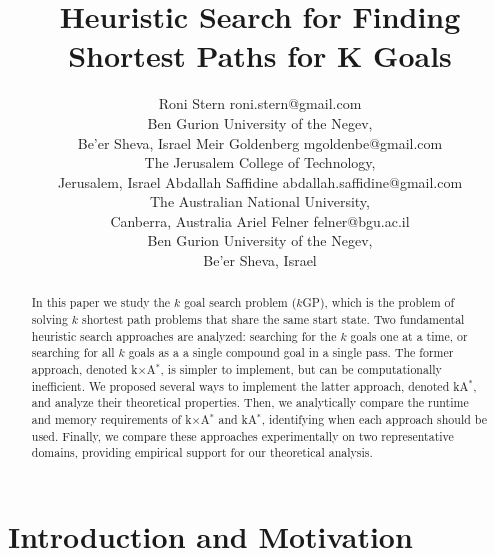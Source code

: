 \documentclass[twoside,11pt]{article}
\newcommand{\kgs}{$k$GP\xspace}
\newcommand{\kastar}{kA$^*$\xspace}
\newcommand{\kxastar}{k$\times$A$^*$\xspace}
\begin{document}
\title{Heuristic Search for Finding Shortest Paths for K Goals}

\author{\name Roni Stern \email roni.stern@gmail.com \\
       \addr Ben Gurion University of the Negev, \\ Be'er Sheva, Israel
	   \AND
	   \name Meir Goldenberg \email mgoldenbe@gmail.com \\
       \addr The Jerusalem College of Technology, \\ Jerusalem, Israel
       \AND
       \name Abdallah Saffidine \email abdallah.saffidine@gmail.com \\
       \addr The Australian National University, \\ Canberra, Australia
       \AND
       \name Ariel Felner \email felner@bgu.ac.il \\
       \addr Ben Gurion University of the Negev, \\ Be'er Sheva, Israel}
	      


\maketitle


\begin{abstract}
  In this paper we study the $k$ goal search problem (\kgs), which is the problem of solving $k$ shortest path problems that share the same start state.
  Two fundamental heuristic search approaches are analyzed: searching for the $k$ goals one at a time, or searching for all $k$ goals as a a single compound goal in a single pass.
  The former approach, denoted \kxastar, is simpler to implement, but can be computationally inefficient.
  We proposed several ways to implement the latter approach, denoted \kastar, and analyze their theoretical properties.
  Then, we analytically compare the runtime and memory requirements of \kxastar and \kastar, identifying when each approach should be used.
  Finally, we compare these approaches experimentally on two representative domains, providing empirical support for our theoretical analysis.
\end{abstract}


\section{Introduction and Motivation}
\end{document}
